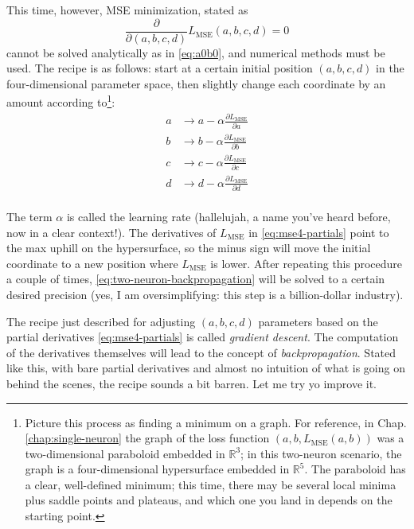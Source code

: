 \documentclass[11pt,a4paper,oneside]{book}
\theoremstyle{definition}
\theoremstyle{plain}
\theoremstyle{remark}
\begin{document}
This time, however, MSE minimization, stated as
\begin{equation}
    \label{eq:two-neuron-backpropagation}
    \frac{\partial}{\partial(a,b,c,d)}L_\text{MSE}(a,b,c,d) = 0
\end{equation}
cannot be solved analytically as in \eqref{eq:a0b0}, and numerical methods must be used. The recipe is as follows: start at a certain initial position $(a,b,c,d)$ in the four-dimensional parameter space, then slightly change each coordinate by an amount according to\footnote{Picture this process as finding a minimum on a graph. For reference, in Chap. \ref{chap:single-neuron} the graph of the loss function $(a,b,L_\text{MSE}(a,b))$ was a two-dimensional paraboloid embedded in $\mathbb{R}^{3}$; in this two-neuron scenario, the graph is a four-dimensional hypersurface embedded in $\mathbb{R}^{5}$. The paraboloid has a clear, well-defined minimum; this time, there may be several local minima plus saddle points and plateaus, and which one you land in depends on the starting point.}:
\begin{equation}
    \begin{split}
        \label{eq:mse4-partials}
        a&\to a-\alpha\frac{\partial L_\text{MSE}}{\partial a}\\
        b&\to b-\alpha\frac{\partial L_\text{MSE}}{\partial b}\\
        c&\to c-\alpha\frac{\partial L_\text{MSE}}{\partial c}\\
        d&\to d-\alpha\frac{\partial L_\text{MSE}}{\partial d}\\
    \end{split}
\end{equation}

The term $\alpha$ is called the learning rate (hallelujah, a name you've heard before, now in a clear context!). The derivatives of $L_\text{MSE}$ in \eqref{eq:mse4-partials} point to the max uphill on the hypersurface, so the minus sign will move the initial coordinate to a new position where $L_\text{MSE}$ is lower. After repeating this procedure a couple of times, \eqref{eq:two-neuron-backpropagation} will be solved to a certain desired precision (yes, I am oversimplifying: this step is a billion-dollar industry).

The recipe just described for adjusting $(a,b,c,d)$ parameters based on the partial derivatives \eqref{eq:mse4-partials} is called {\it gradient descent}. The computation of the derivatives themselves will lead to the concept of {\it backpropagation}. Stated like this, with bare partial derivatives and almost no intuition of what is going on behind the scenes, the recipe sounds a bit barren. Let me try yo improve it.
\end{document}
